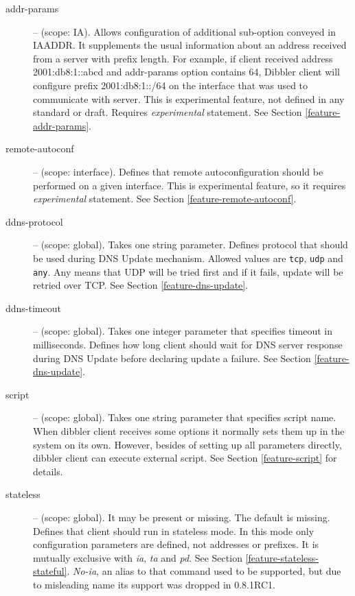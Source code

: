 \begin{description}
\item[addr-params] -- (scope: IA). Allows configuration of additional
sub-option conveyed in IAADDR. It supplements the usual information
about an address received from a server with prefix length. For
example, if client received address 2001:db8:1::abcd and addr-params
option contains 64, Dibbler client will configure prefix
2001:db8:1::/64 on the interface that was used to communicate with
server. This is experimental feature, not defined in any standard or
draft. Requires \emph{experimental} statement. See
Section \ref{feature-addr-params}.

\item[remote-autoconf] -- (scope: interface). Defines that remote
autoconfiguration should be performed on a given interface. This is
experimental feature, so it requires \emph{experimental}
statement. See Section \ref{feature-remote-autoconf}.

\item[ddns-protocol] -- (scope: global). Takes one string
parameter. Defines protocol that should be used during DNS Update
mechanism. Allowed values are \verb+tcp+, \verb+udp+ and \verb+any+.
Any means that UDP will be tried first and if it fails, update will be
retried over TCP. See Section \ref{feature-dns-update}.

\item[ddns-timeout] -- (scope: global). Takes one integer parameter
that specifies timeout in milliseconds. Defines how long client should
wait for DNS server response during DNS Update before declaring
update a failure. See Section \ref{feature-dns-update}.

\item[script] -- (scope: global). Takes one string parameter that
  specifies script name. When dibbler client receives some options it normally
  sets them up in the system on its own. However, besides of setting up all
  parameters directly, dibbler client can execute external
  script. See Section \ref{feature-script} for details.

\item[stateless] -- (scope: global). It may be present or missing. The
  default is missing. Defines that client should run in stateless
  mode. In this mode only configuration parameters are defined, not
  addresses or prefixes. It is mutually exclusive
  with \emph{ia}, \emph{ta} and \emph{pd}. See
  Section \ref{feature-stateless-stateful}. \emph{No-ia}, an alias to that
  command used to be supported, but due to misleading name its support
  was dropped in 0.8.1RC1.



\end{description}
